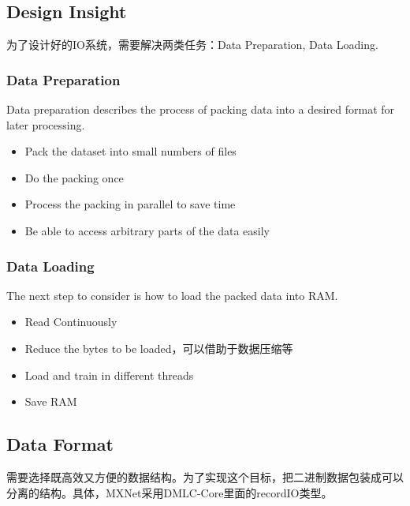 \subsection{Design Insight}

为了设计好的IO系统，需要解决两类任务：Data Preparation, Data Loading.

\subsubsection{Data Preparation}

Data preparation describes the process of packing data into a desired format for later processing. 

\begin{itemize}
\item Pack the dataset into small numbers of files
\item Do the packing once
\item Process the packing in parallel to save time
\item Be able to access arbitrary parts of the data easily
\end{itemize}

\subsubsection{Data Loading}

The next step to consider is how to load the packed data into RAM. 

\begin{itemize}
\item Read Continuously
\item Reduce the bytes to be loaded，可以借助于数据压缩等
\item Load and train in different threads
\item Save RAM
\end{itemize}

\subsection{Data Format}

需要选择既高效又方便的数据结构。为了实现这个目标，把二进制数据包装成可以分离的结构。具体，MXNet采用DMLC-Core里面的recordIO类型。

